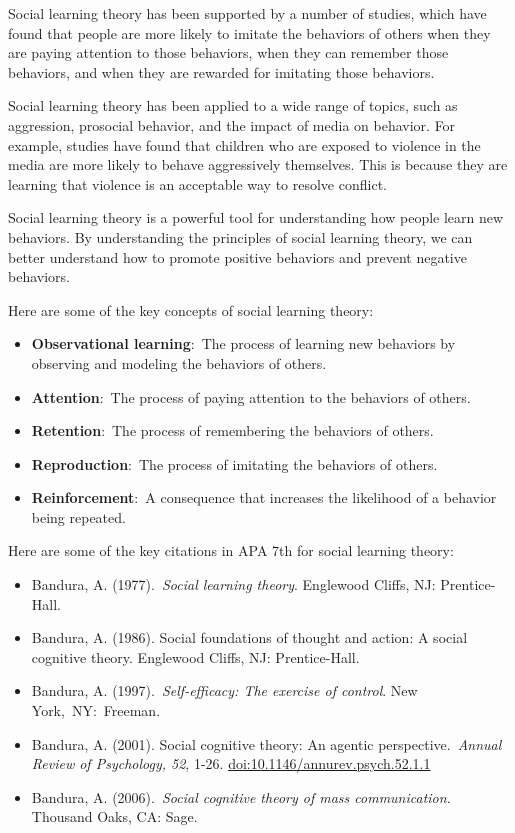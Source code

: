 \documentclass[
]{book}
\begin{document}
Social learning theory has been supported by a number of studies, which have found that people are more likely to imitate the behaviors of others when they are paying attention to those behaviors, when they can remember those behaviors, and when they are rewarded for imitating those behaviors.

Social learning theory has been applied to a wide range of topics, such as aggression, prosocial behavior, and the impact of media on behavior. For example, studies have found that children who are exposed to violence in the media are more likely to behave aggressively themselves. This is because they are learning that violence is an acceptable way to resolve conflict.

Social learning theory is a powerful tool for understanding how people learn new behaviors. By understanding the principles of social learning theory, we can better understand how to promote positive behaviors and prevent negative behaviors.

Here are some of the key concepts of social learning theory:

\begin{itemize}
\item
  \textbf{Observational learning}:~The process of learning new behaviors by observing and modeling the behaviors of others.
\item
  \textbf{Attention}:~The process of paying attention to the behaviors of others.
\item
  \textbf{Retention}:~The process of remembering the behaviors of others.
\item
  \textbf{Reproduction}:~The process of imitating the behaviors of others.
\item
  \textbf{Reinforcement}:~A consequence that increases the likelihood of a behavior being repeated.
\end{itemize}

Here are some of the key citations in APA 7th for social learning theory:

\begin{itemize}
\item
  Bandura, A. (1977).~\emph{Social learning theory}. Englewood Cliffs, NJ: Prentice-Hall.
\item
  Bandura, A. (1986). Social foundations of thought and action: A social cognitive theory. Englewood Cliffs, NJ: Prentice-Hall.
\item
  Bandura, A. (1997).~\emph{Self-efficacy: The exercise of control}. New York,~NY:~Freeman.
\item
  Bandura, A. (2001). Social cognitive theory: An agentic perspective.~\emph{Annual Review of Psychology, 52}, 1-26. \url{doi:10.1146/annurev.psych.52.1.1}
\item
  Bandura, A. (2006).~\emph{Social cognitive theory of mass communication}. Thousand Oaks, CA: Sage.
\end{itemize}
\end{document}
